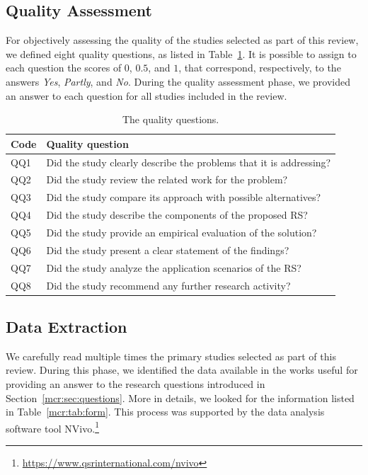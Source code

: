\subsection{Quality Assessment}
For objectively assessing the quality of the studies selected as part of this review, we defined eight quality questions, as listed in Table~\ref{mcr:tab:quality}. It is possible to assign to each question the scores of $0$, $0.5$, and $1$, that correspond, respectively, to the answers \emph{Yes}, \emph{Partly}, and \emph{No}. During the quality assessment phase, we provided an answer to each question for all studies included in the review.%
 
\begin{table}
\centering
\begin{tabular}{@{}ll@{}}
\toprule
Code & Quality question \\ \midrule
QQ1 & Did the study clearly describe the problems that it is addressing? \\
QQ2 & Did the study review the related work for the problem? \\
QQ3 & Did the study compare its approach with possible alternatives? \\
QQ4 & Did the study describe the components of the proposed RS? \\
QQ5 & Did the study provide an empirical evaluation of the solution? \\
QQ6 & Did the study present a clear statement of the findings? \\
QQ7 & Did the study analyze the application scenarios of the RS? \\
QQ8 & Did the study recommend any further research activity? \\ \bottomrule
\end{tabular}
\caption[Quality questions]{The quality questions.}
\label{mcr:tab:quality}
\end{table}

\subsection{Data Extraction}
We carefully read multiple times the primary studies selected as part of this review. During this phase, we identified the data available in the works useful for providing an answer to the research questions introduced in Section~\ref{mcr:sec:questions}. More in details, we looked for the information listed in Table~\ref{mcr:tab:form}. This process was supported by the data analysis software tool NVivo.\footnote{\url{https://www.qsrinternational.com/nvivo}}

